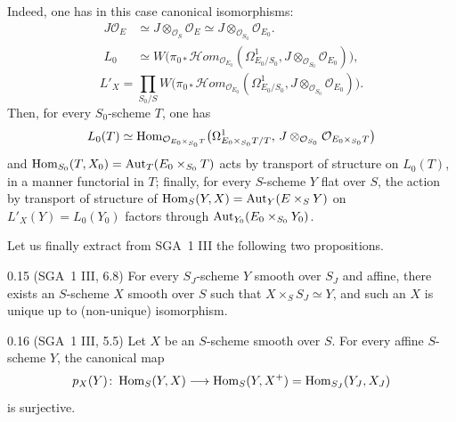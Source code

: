 Indeed, one has in this case canonical isomorphisms:
\begin{align*}
J\mathcal{O}_{E}
  &\simeq J\otimes_{\mathcal{O}_{S}}\mathcal{O}_{E}
  \simeq J\otimes_{\mathcal{O}_{S_{0}}}\mathcal{O}_{E_{0}}.\\
L_{0}
  &\simeq W\bigl(
    \pi_{0*}\mathcal{H}\mathit{om}_{\mathcal{O}_{E_{0}}}
      (\Omega^{1}_{E_{0}/S_{0}},
        J\otimes_{\mathcal{O}_{S_{0}}}\mathcal{O}_{E_{0}})
  \bigr),
\end{align*}
\begin{equation}
L'_{X}
  =\prod_{S_{0}/S}
  W\bigl(
    \pi_{0*}\mathcal{H}\mathit{om}_{\mathcal{O}_{E_{0}}}
      (\Omega^{1}_{E_{0}/S_{0}},
        J\otimes_{\mathcal{O}_{S_{0}}}\mathcal{O}_{E_{0}})
  \bigr).
\tag{0.14.2}
\end{equation}
Then, for every \(S_{0}\)-scheme \(T\), one has
\[
L_{0}(T)
  \simeq
  \operatorname{Hom}_{\mathcal{O}_{E_{0}\times_{S_{0}}T}}
    \bigl(
      \Omega^{1}_{E_{0}\times_{S_{0}}T/T},\,
      J\otimes_{\mathcal{O}_{S_{0}}}\mathcal{O}_{E_{0}\times_{S_{0}}T}
    \bigr)
\]
and \(\operatorname{Hom}_{S_{0}}(T, X_{0})=\operatorname{Aut}_{T}(E_{0}\times_{S_{0}}T)\) acts by
transport of structure on \(L_{0}(T)\), in a manner functorial in \(T\);
finally, for every \(S\)-scheme \(Y\) flat over \(S\), the action by transport
of structure of \(\operatorname{Hom}_{S}(Y, X)=\operatorname{Aut}_{Y}(E\times_{S}Y)\) on
\(L'_{X}(Y)=L_{0}(Y_{0})\) factors through
\(\operatorname{Aut}_{Y_{0}}(E_{0}\times_{S_{0}}Y_{0})\).

Let us finally extract from SGA~1 III the following two propositions.

\begin{proposition}{0.15}\label{III.0.15}
(SGA~1 III, 6.8)%
{\renewcommand{\thefootnote}{(32)}}
For every \(S_{J}\)-scheme \(Y\) smooth over \(S_{J}\) and affine, there
exists an \(S\)-scheme \(X\) smooth over \(S\) such that
\(X\times_{S}S_{J}\simeq Y\), and such an \(X\) is unique up to
(non-unique) isomorphism.
\end{proposition}

\begin{proposition}{0.16}\label{III.0.16}
(SGA~1 III, 5.5)%
{\renewcommand{\thefootnote}{(33)}}
Let \(X\) be an \(S\)-scheme smooth over \(S\). For every affine \(S\)-scheme
\(Y\), the canonical map
\[
p_{X}(Y)\colon
  \operatorname{Hom}_{S}(Y, X)
  \longrightarrow
  \operatorname{Hom}_{S}(Y, X^{+})
  =\operatorname{Hom}_{S_{J}}(Y_{J}, X_{J})
\]
is surjective.
\end{proposition}

